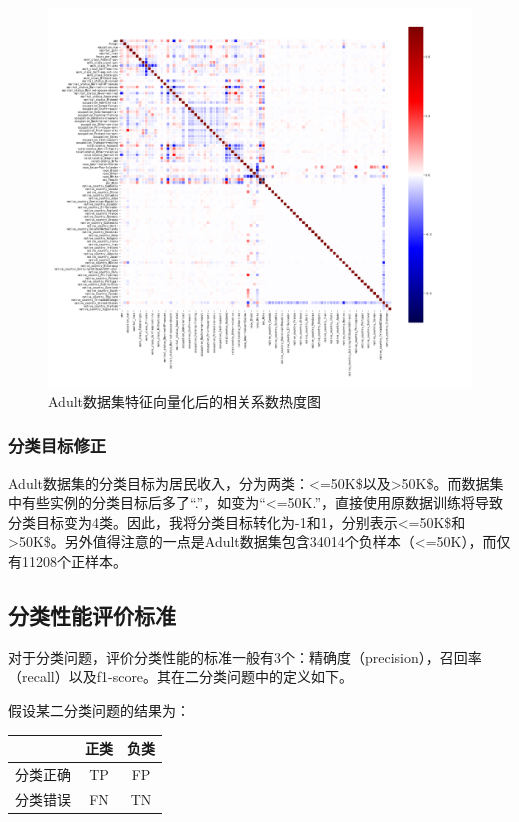 \documentclass[12pt,a4paper]{article}
\theoremstyle{definition}
\begin{document}
\begin{figure}[H]
	\centering
	\includegraphics[width=0.925\linewidth]{img/cof_heat2.png}
	\caption{Adult数据集特征向量化后的相关系数热度图}
	\label{fig:heat3}
\end{figure}

\subsubsection{分类目标修正}
\label{sec:fix-target}

Adult数据集的分类目标为居民收入，分为两类：<=50K\$以及>50K\$。而数据集中有些实例的分类目标后多了“.”，如变为“<=50K.”，直接使用原数据训练将导致分类目标变为4类。因此，我将分类目标转化为-1和1，分别表示<=50K\$和>50K\$。另外值得注意的一点是Adult数据集包含34014个负样本（<=50K），而仅有11208个正样本。

\subsection{分类性能评价标准}

对于分类问题，评价分类性能的标准一般有3个：精确度（precision），召回率（recall）以及f1-score。其在二分类问题中的定义如下。

\vspace{0.01\linewidth}
假设某二分类问题的结果为：

\begin{table}[H]
	\centering
	\renewcommand\arraystretch{1.35}
	\begin{tabular}{c|c|c}
		& 正类 &  负类 \\
		\hline
		\hline
	
		 分类正确 & TP & FP \\
		 分类错误 & FN & TN \\
	\end{tabular}
\end{table}
\end{document}
